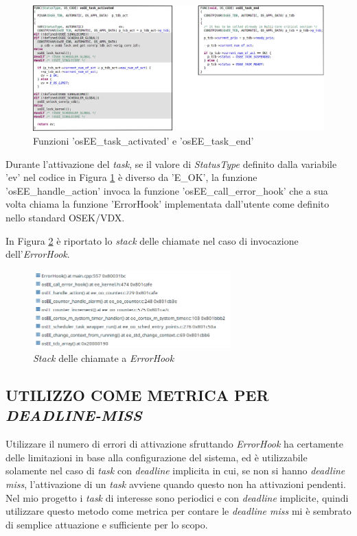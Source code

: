 \documentclass{article}
\begin{document}
\begin{figure}[!htbp]
	\centering
	\includegraphics[width=5in]{Approfondimento/osEE_task_activated_end.png}
	\caption{Funzioni 'osEE\_task\_activated' e 'osEE\_task\_end'}
	\label{act}
\end{figure}

Durante l'attivazione del \textit{task}, se il valore di \textit{StatusType} definito dalla variabile 'ev' nel codice in Figura \ref{act} è diverso da 'E\_OK', la funzione 'osEE\_handle\_action' invoca la funzione 'osEE\_call\_error\_hook' che a sua volta chiama la funzione 'ErrorHook' implementata dall'utente come definito nello standard OSEK/VDX.

In Figura \ref{stack} è riportato lo \textit{stack} delle chiamate nel caso di invocazione dell'\textit{ErrorHook}.

\begin{figure}[!htbp]
	\centering
	\includegraphics[width=3in]{Approfondimento/Stack_ErrorHook.png}
	\caption{\textit{Stack} delle chiamate a \textit{ErrorHook}}
	\label{stack}
\end{figure}

\subsection{UTILIZZO COME METRICA PER \textit{DEADLINE-MISS}}
Utilizzare il numero di errori di attivazione sfruttando \textit{ErrorHook} ha certamente delle limitazioni in base alla configurazione del sistema, ed è utilizzabile solamente nel caso di \textit{task} con \textit{deadline} implicita in cui, se non si hanno \textit{deadline miss}, l'attivazione di un \textit{task} avviene quando questo non ha attivazioni pendenti. Nel mio progetto i \textit{task} di interesse sono periodici e con \textit{deadline} implicite, quindi utilizzare questo metodo come metrica per contare le \textit{deadline miss} mi è sembrato di semplice attuazione e sufficiente per lo scopo.
\end{document}
